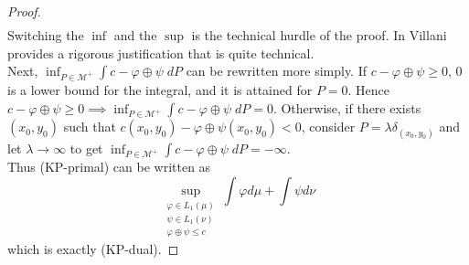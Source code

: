 \documentclass{article}
\theoremstyle{definition}
\theoremstyle{remark}
\begin{document}
\begin{proof}
$$\begin{aligned}
\end{aligned}$$
Switching the $\inf$ and the $\sup$ is the technical hurdle of the proof. In \cite{villani2003topics} Villani provides a rigorous justification that is quite technical. \\
Next, $\inf_{P\in \mathcal M^+}   \int c - \varphi\oplus \psi\; dP$ can be rewritten more simply. If $c - \varphi\oplus \psi \geq 0$, $0$ is a lower bound for the integral, and it is attained for $P=0$. Hence $c - \varphi\oplus \psi \geq 0 \implies \inf_{P\in \mathcal M^+}   \int c - \varphi\oplus \psi\; dP = 0$. Otherwise, if there exists $(x_0,y_0)$ such that $c(x_0,y_0) - \varphi\oplus \psi(x_0,y_0) <0$, consider $P=\lambda \delta_{(x_0,y_0)}$ and let $\lambda \to \infty$ to get $\inf_{P\in \mathcal M^+}   \int c - \varphi\oplus \psi\; dP = -\infty$.\\
Thus (KP-primal) can be written as $$\sup_{\substack{\varphi \in L_1(\mu)\\ \psi \in L_1(\nu)\\ \varphi \oplus \psi \leq c}} \int \varphi d\mu + \int \psi d\nu$$
which is exactly (KP-dual).
\end{proof}

\newpage


\end{document}

